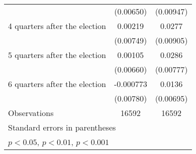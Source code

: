 \begin{table}[htbp]
\begin{tabular}{l*{2}{c}}
                    &   (0.00650)         &   (0.00947)         \\
[1em]
 4 quarters after the election&     0.00219         &      0.0277\sym{**} \\
                    &   (0.00749)         &   (0.00905)         \\
[1em]
 5 quarters after the election&     0.00105         &      0.0286\sym{***}\\
                    &   (0.00660)         &   (0.00777)         \\
[1em]
 6 quarters after the election&   -0.000773         &      0.0136         \\
                    &   (0.00780)         &   (0.00695)         \\
\hline
Observations        &       16592         &       16592         \\
\hline\hline
\multicolumn{3}{l}{\footnotesize Standard errors in parentheses}\\
\multicolumn{3}{l}{\footnotesize \sym{*} \(p<0.05\), \sym{**} \(p<0.01\), \sym{***} \(p<0.001\)}\\
\end{tabular}
\end{table}
